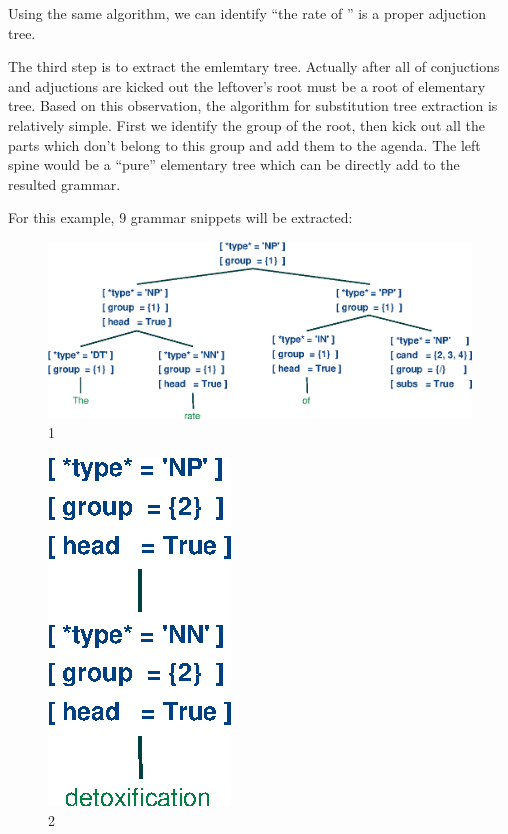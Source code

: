 \documentclass[a4paper]{article}
\begin{document}
Using the same algorithm, we can identify ``the rate of '' is a proper adjuction tree.

The third step is to extract the emlemtary tree. Actually after all of conjuctions and adjuctions are kicked out the leftover's root must be a root of elementary tree. Based on this observation, the algorithm for substitution tree extraction is relatively simple. First we identify the group of the root, then kick out all the parts which don't belong to this group and add them to the agenda. The left spine would be a ``pure'' elementary tree which can be directly add to the resulted grammar.

For this example, 9 grammar snippets will be extracted:

\begin{figure}[h]
    \begin{center}
        \includegraphics[scale=0.5]{1.eps}
    \end{center}
    \caption{1}
\end{figure}
\begin{figure}[h]
    \begin{center}
        \includegraphics[scale=0.5]{2.eps}
    \end{center}
    \caption{2}
\end{figure}
\end{document}
